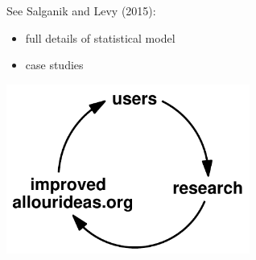 \documentclass[aspectratio=169]{beamer}
\begin{document}
\begin{frame}

See Salganik and Levy (2015):
\begin{itemize}
\item full details of statistical model
\item case studies
\end{itemize}

\end{frame}
\begin{frame}

\begin{center}
\includegraphics[width=0.6\textwidth]{figures/virtuous_cycle}
\end{center}

\end{frame}
\end{document}
